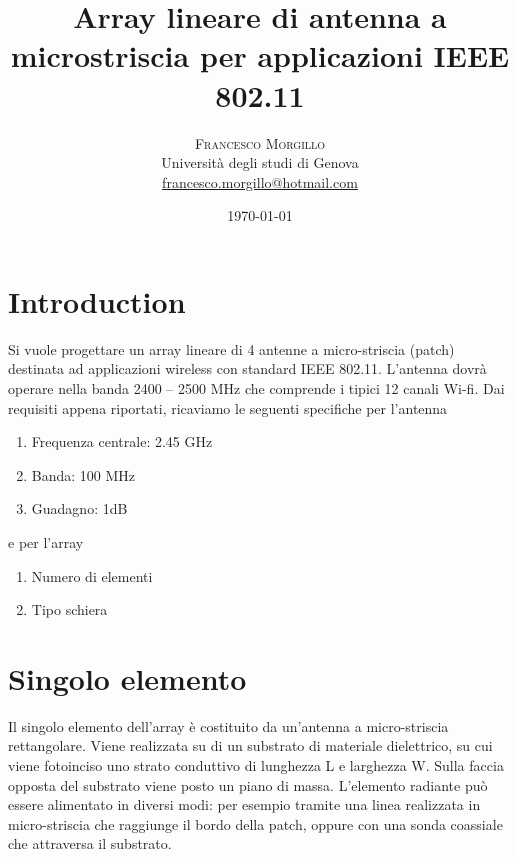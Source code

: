\documentclass[twoside,twocolumn]{article}
\title{Array lineare di antenna a microstriscia per applicazioni IEEE 802.11} %
\author{%
\textsc{Francesco Morgillo}\\[1ex] %
\normalsize Università degli studi di Genova \\ %
\normalsize \href{mailto:francesco.morgillo@hotmail.com}{francesco.morgillo@hotmail.com} %
}
\date{\today} %
\begin{document}
\maketitle


\section{Introduction}


Si vuole progettare un array lineare di 4 antenne a micro-striscia (patch) destinata ad applicazioni wireless con standard IEEE 802.11.
L'antenna dovrà operare nella banda 2400 – 2500 MHz che comprende i tipici 12 canali Wi-fi.
Dai requisiti appena riportati, ricaviamo le seguenti specifiche per l'antenna

\begin{enumerate}[noitemsep] %
\item Frequenza centrale: 2.45 GHz
\item Banda: 100 MHz
\item Guadagno: 1dB 
\end{enumerate}
 e per l'array
 \begin{enumerate}[noitemsep] %
\item Numero di elementi
\item Tipo schiera
\end{enumerate}



\section{Singolo elemento}
Il singolo elemento dell'array è costituito da un'antenna a micro-striscia rettangolare.
Viene realizzata su di un substrato di materiale dielettrico, su cui viene fotoinciso uno strato conduttivo di lunghezza L e larghezza W. Sulla faccia opposta del substrato viene posto un piano di massa. L'elemento radiante può essere alimentato in diversi modi: per esempio tramite una linea realizzata in micro-striscia che raggiunge il bordo della patch, oppure con una sonda coassiale che attraversa il substrato.
\end{document}
